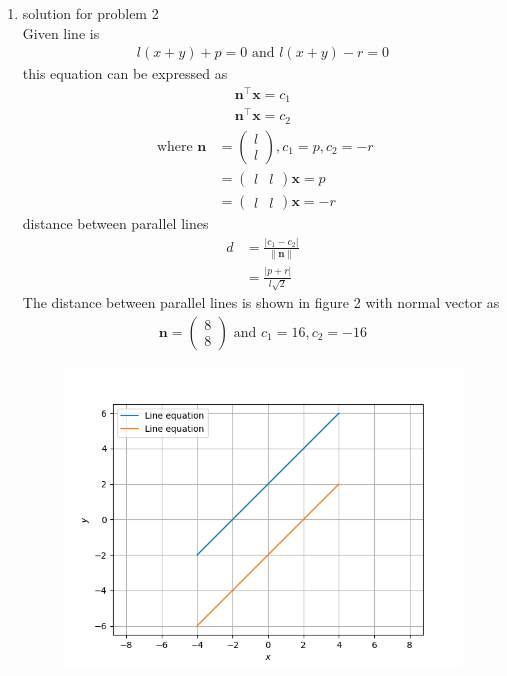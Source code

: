 \documentclass[12pt]{article}
\providecommand{\abs}[1]{\left\vert#1\right\vert}
\providecommand{\norm}[1]{\left\lVert#1\right\rVert}
\newcommand{\myvec}[1]{\ensuremath{\begin{pmatrix}#1\end{pmatrix}}}
\let\vec\mathbf
\begin{document}
\begin{enumerate}
\begin{figure}[h!]
\begin{center}
\end{center}
\caption{}
\label{fig:Fig1}
\end{figure}
	\item solution for problem 2
	\\
Given line is 
\begin{align}
l(x+y)+p=0\text{ and }l(x+y)-r=0
\end{align}
this equation can be expressed as 
\begin{align}
\vec{n}^{\top}\vec{x}=c_1\\
\vec{n}^{\top}\vec{x}=c_2
\end{align}
\begin{align}
\text{ where }
\vec{n}& = \myvec{l\\l},c_1=p,c_2=-r\\
& =\myvec{l&l}\vec{x}=p\\ 
& =\myvec{l&l}\vec{x}=-r		
\end{align}
distance between parallel lines 
\begin{align}
d&=\frac{\abs{c_1-c_2}}{\norm{\vec{n}}}\\
&=\frac{\abs{p+r}}{l\sqrt{2}}
\end{align}	
The distance between parallel lines 
is shown in figure 2  with normal vector as 
\begin{align*}
\vec{n} =\myvec{8\\8} \text{ and }c_1=16,c_2=-16
\end{align*}
\begin{figure}[h!]
\begin{center}
\includegraphics[width=\columnwidth]{para1.png}
\end{center}
\caption{}
\label{fig:Fig2}
\end{figure}
\end{enumerate}
\end{document}
